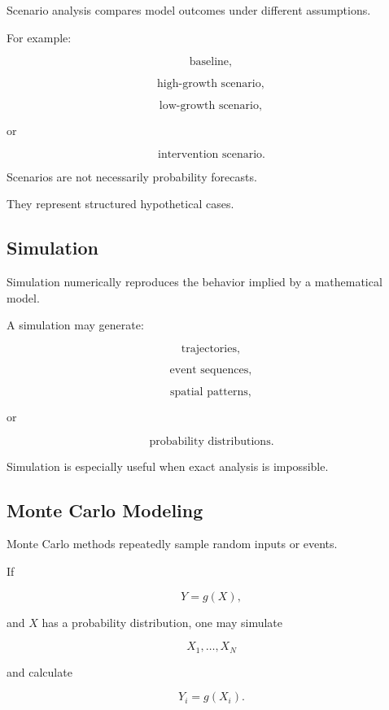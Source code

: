 Scenario analysis compares model outcomes under different assumptions.

For example:

\[
\boxed{
\text{baseline},
}
\]

\[
\boxed{
\text{high-growth scenario},
}
\]

\[
\boxed{
\text{low-growth scenario},
}
\]

or

\[
\boxed{
\text{intervention scenario}.
}
\]

Scenarios are not necessarily probability forecasts.

They represent structured hypothetical cases.

\subsection{Simulation}
\label{subsec:mathematical-simulation}

Simulation numerically reproduces the behavior implied by a mathematical
model.

A simulation may generate:

\[
\boxed{
\text{trajectories},
}
\]

\[
\boxed{
\text{event sequences},
}
\]

\[
\boxed{
\text{spatial patterns},
}
\]

or

\[
\boxed{
\text{probability distributions}.
}
\]

Simulation is especially useful when exact analysis is impossible.

\subsection{Monte Carlo Modeling}
\label{subsec:modeling-monte-carlo}

Monte Carlo methods repeatedly sample random inputs or events.

If

\[
Y=g(X),
\]

and \(X\) has a probability distribution, one may simulate

\[
X_1,\ldots,X_N
\]

and calculate

\[
Y_i=g(X_i).
\]

